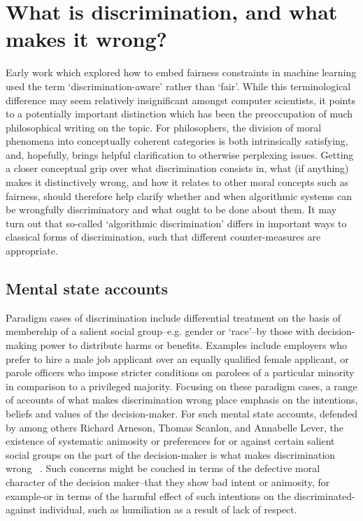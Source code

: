 \documentclass[pmlr,twocolumn,10pt]{jmlr}%
\begin{document}
\section{What is discrimination, and what makes it wrong?}

Early work which explored how to embed fairness constraints in machine learning used the term `discrimination-aware' rather than `fair'. While this terminological difference may seem relatively insignificant amongst computer scientists, it points to a potentially important distinction which has been the preoccupation of much philosophical writing on the topic. For philosophers, the division of moral phenomena into conceptually coherent categories is both intrinsically satisfying, and, hopefully, brings helpful clarification to otherwise perplexing issues. Getting a closer conceptual grip over what discrimination consists in, what (if anything) makes it distinctively wrong, and how it relates to other moral concepts such as fairness, should therefore help clarify whether and when algorithmic systems can be wrongfully discriminatory and what ought to be done about them. It may turn out that so-called `algorithmic discrimination' differs in important ways to classical forms of discrimination, such that different counter-measures are appropriate.

\subsection{Mental state accounts}

Paradigm cases of discrimination include differential treatment on the basis of membership of a salient social group--e.g. gender or `race'--by those with decision-making power to distribute harms or benefits. Examples include employers who prefer to hire a male job applicant over an equally qualified female applicant, or parole officers who impose stricter conditions on parolees of a particular minority in comparison to a privileged majority. Focusing on these paradigm cases, a range of accounts of what makes discrimination wrong place emphasis on the intentions, beliefs and values of the decision-maker. For such mental state accounts, defended by among others Richard Arneson, Thomas Scanlon, and Annabelle Lever, the existence of systematic animosity or preferences for or against certain salient social groups on the part of the decision-maker is what makes discrimination wrong ~\cite{arneson1989equality,lever2016racial,scanlon2009moral}. Such concerns might be couched in terms of the defective moral character of the decision maker--that they show bad intent or animosity, for example-or in terms of the harmful effect of such intentions on the discriminated-against individual, such as humiliation as a result of lack of respect.
\end{document}
